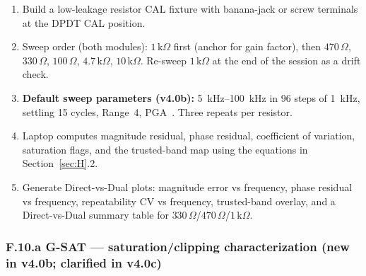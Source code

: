 \documentclass[11pt,a4paper]{article}
\newcommand{\kohm}[1]{\ensuremath{#1\,\mathrm{k}\Omega}}
\newcommand{\Rohm}[1]{\ensuremath{#1\,\Omega}}
\begin{document}
\begin{enumerate}
\item Build a low-leakage resistor CAL fixture with banana-jack or screw terminals at the DPDT CAL position.
\item Sweep order (both modules): \kohm{1} first (anchor for gain factor), then \Rohm{470}, \Rohm{330}, \Rohm{100}, \kohm{4.7}, \kohm{10}. Re-sweep \kohm{1} at the end of the session as a drift check.
\item \textbf{Default sweep parameters (v4.0b):} \SIrange{5}{100}{\kilo\hertz} in 96 steps of \SI{1}{\kilo\hertz}, settling 15 cycles, Range~4, PGA~. Three repeats per resistor.
\item Laptop computes magnitude residual, phase residual, coefficient of variation, saturation flags, and the trusted-band map using the equations in Section~\ref{sec:H}.2.
\item Generate Direct-vs-Dual plots: magnitude error vs frequency, phase residual vs frequency, repeatability CV vs frequency, trusted-band overlay, and a Direct-vs-Dual summary table for \Rohm{330}/\Rohm{470}/\kohm{1}.
\end{enumerate}

\subsubsection*{F.10.a G-SAT --- saturation/clipping characterization (new in v4.0b; clarified in v4.0c)}
\end{document}
